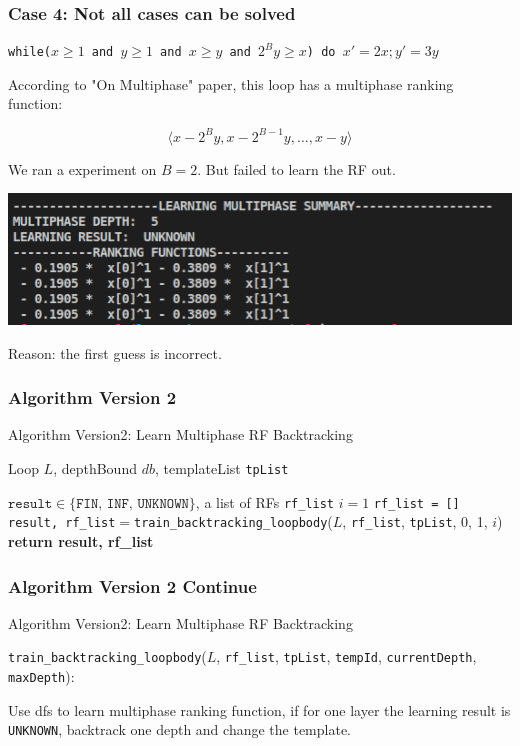\documentclass[10pt]{beamer}
\begin{document}
\begin{frame}\frametitle{Case 4: Not all cases can be solved}
\begin{example}
\texttt{while($x \ge 1$ and $y \ge 1 $ and $x \ge y$ and $2^By \ge x$) do }$x' = 2x; y' = 3y$

\end{example}
According to "On Multiphase" paper, this loop has a multiphase ranking function:

\[\langle x - 2^By, x - 2^{B-1}y, \ldots, x - y\rangle\]


We ran a experiment on $B = 2$. But failed to learn the RF out.
\begin{center}
\includegraphics[scale=0.5]{5.png}
\end{center}

Reason: the first guess is incorrect.
\end{frame}



\begin{frame}\frametitle{Algorithm Version 2}

\begin{algorithm}[H]
\caption{Algorithm Version2: Learn Multiphase RF Backtracking }
\begin{algorithmic}[1]
\REQUIRE Loop $L$, depthBound $db$, templateList \texttt{tpList}

\ENSURE $\texttt{result}\in \{\texttt{FIN, INF, UNKNOWN}\}$, a list of RFs \texttt{rf\_list}
\STATE $i = 1$
\STATE \texttt{rf\_list = []}
\STATE \texttt{result, rf\_list}$=$\texttt{train\_backtracking\_loopbody}($L$, \texttt{rf\_list}, \texttt{tpList}, 0, 1, $i$)
	\textbf{return result, rf\_list}
\ENDIF
\ENDWHILE
\end{algorithmic}
\end{algorithm}

\end{frame}

\begin{frame}\frametitle{Algorithm Version 2 Continue}

\begin{algorithm}[H]
\caption{Algorithm Version2: Learn Multiphase RF Backtracking }
\begin{algorithmic}[1]

\STATE \texttt{train\_backtracking\_loopbody}($L$, \texttt{rf\_list}, \texttt{tpList}, \texttt{tempId}, \texttt{currentDepth}, \texttt{maxDepth}):

\end{algorithmic}
\end{algorithm}

Use dfs to learn multiphase ranking function, if for one layer the learning result is \texttt{UNKNOWN}, backtrack one depth and change the template.
\end{frame}
\end{document}

